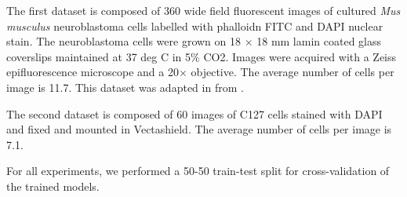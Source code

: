 \documentclass[10pt, journal, compsoc]{IEEEtran}
\begin{document}
The first dataset is composed of 360 wide field fluorescent images of cultured \textit{Mus musculus} neuroblastoma cells labelled with phalloidn FITC and DAPI nuclear stain. The neuroblastoma cells were grown on 18 $\times$ 18 mm lamin coated glass coverslips maintained at 37 deg C in 5\% CO2. Images were acquired with a Zeiss epifluorescence microscope and a 20$\times$ objective. The average number of cells per image is 11.7. This dataset was adapted in \cite{waithe_dominic_2019_2632769} from \cite{neuroblastoma_dataset}.

The second dataset is composed of 60 images of C127 cells stained with DAPI and fixed and mounted in Vectashield. The average number of cells per image is 7.1.

For all experiments, we performed a 50-50 train-test split for cross-validation of the trained models.
\end{document}
